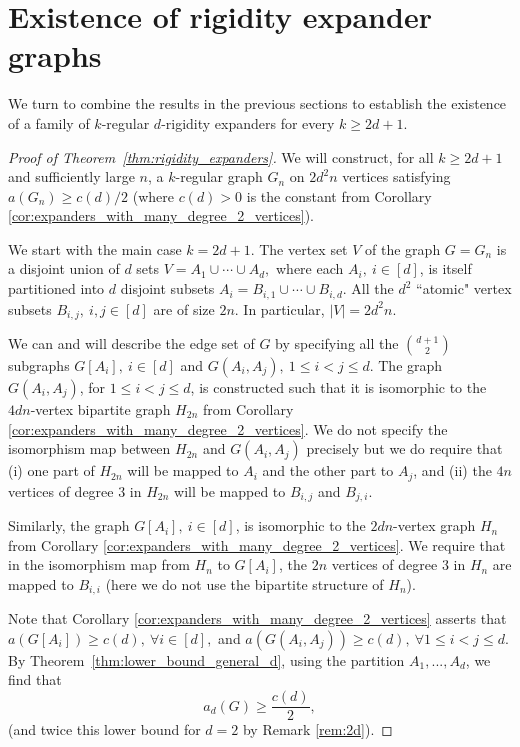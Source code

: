 \documentclass[a4paper,11pt]{article}
\theoremstyle{plain}
\theoremstyle{definition}
\begin{document}
\section{Existence of rigidity expander graphs}\label{sec:rigidity_expanders}
We turn to combine the results in the previous sections to establish the existence of a family of $k$-regular $d$-rigidity expanders for every $k\ge 2d+1$.
\begin{proof}
[Proof of Theorem~\ref{thm:rigidity_expanders}]
We will construct, for all $k\geq 2d+1$ and sufficiently large $n$, a $k$-regular graph $G_n$ on $2d^2 n$ vertices satisfying $a(G_n)\geq c(d)/2$ (where $c(d)>0$ is the constant from Corollary \ref{cor:expanders_with_many_degree_2_vertices}). 

We start with the main case $k=2d+1$. The vertex set $V$ of the graph $G=G_n$ is a disjoint union of $d$ sets $V=A_1\cup\cdots\cup A_d,$ where each $A_i,~i\in[d]$, is itself partitioned into $d$ disjoint subsets $A_i = B_{i,1}\cup\cdots\cup B_{i,d}$. All the $d^2$ ``atomic" vertex subsets $B_{i,j}, ~i,j\in[d]$ are of size $2n$. In particular, $|V|=2d^2n$.

We can and will describe the edge set of $G$ by specifying all the $\binom{d+1}2$ subgraphs  $G[A_i],~i\in[d]$ and $G(A_i,A_j),~1\le i<j\le d$. 
The graph $G(A_i,A_j)$, for $1\le i < j \le d$, is constructed such that it is isomorphic to the $4dn$-vertex bipartite graph $H_{2n}$ from Corollary \ref{cor:expanders_with_many_degree_2_vertices}. We do not specify the isomorphism map between $H_{2n}$ and $G(A_i,A_j)$ precisely but we do require that (i) one part of $H_{2n}$ will be mapped to $A_i$ and the other part to $A_j$, and (ii) the $4n$ vertices of degree $3$ in $H_{2n}$ will be mapped to $B_{i,j}$ and $B_{j,i}$.

Similarly, the graph $G[A_i],~i\in[d]$, is isomorphic to the $2dn$-vertex graph $H_n$ from Corollary \ref{cor:expanders_with_many_degree_2_vertices}. We require that in the isomorphism map from $H_n$ to $G[A_i]$, the $2n$ vertices of degree $3$ in $H_n$ are mapped to $B_{i,i}$ (here we do not use the bipartite structure of $H_n$).


Note that Corollary \ref{cor:expanders_with_many_degree_2_vertices} asserts that $a(G[A_i])\ge c(d),~\forall i\in[d],$ and $a(G(A_i,A_j))\ge c(d),~\forall 1\le i<j\le d.$ By Theorem~\ref{thm:lower_bound_general_d}, using the partition $A_1,...,A_d$, we find that
\[a_d(G)\ge \frac{c(d)}{2},
\] (and twice this lower bound for $d=2$ by Remark \ref{rem:2d}).


\end{proof}
\end{document}
